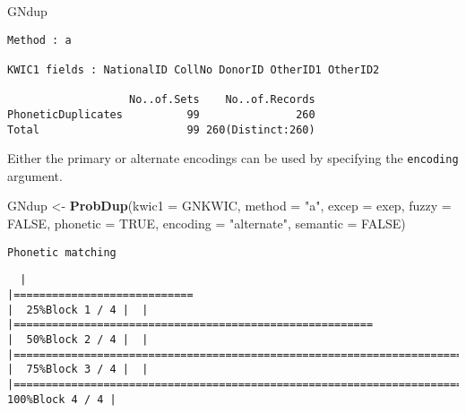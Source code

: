 \documentclass[
]{article}
\newenvironment{Shaded}{\begin{snugshade}}{\end{snugshade}}
\newcommand{\DataTypeTok}[1]{\textcolor[rgb]{0.13,0.29,0.53}{#1}}
\newcommand{\KeywordTok}[1]{\textcolor[rgb]{0.13,0.29,0.53}{\textbf{#1}}}
\newcommand{\NormalTok}[1]{#1}
\newcommand{\OtherTok}[1]{\textcolor[rgb]{0.56,0.35,0.01}{#1}}
\newcommand{\StringTok}[1]{\textcolor[rgb]{0.31,0.60,0.02}{#1}}
\begin{document}
\begin{Shaded}
\begin{Highlighting}[]
\NormalTok{GNdup}
\end{Highlighting}
\end{Shaded}

\begin{verbatim}
Method : a

KWIC1 fields : NationalID CollNo DonorID OtherID1 OtherID2
 
                   No..of.Sets    No..of.Records
PhoneticDuplicates          99               260
Total                       99 260(Distinct:260)
\end{verbatim}

Either the primary or alternate encodings can be used by specifying the
\texttt{encoding} argument.

\begin{Shaded}
\begin{Highlighting}[]
\NormalTok{GNdup <-}\StringTok{ }\KeywordTok{ProbDup}\NormalTok{(}\DataTypeTok{kwic1 =}\NormalTok{ GNKWIC, }\DataTypeTok{method =} \StringTok{"a"}\NormalTok{, }\DataTypeTok{excep =}\NormalTok{ exep, }
                 \DataTypeTok{fuzzy =} \OtherTok{FALSE}\NormalTok{,}
                 \DataTypeTok{phonetic =} \OtherTok{TRUE}\NormalTok{, }\DataTypeTok{encoding =} \StringTok{"alternate"}\NormalTok{,}
                 \DataTypeTok{semantic =} \OtherTok{FALSE}\NormalTok{)}
\end{Highlighting}
\end{Shaded}

\begin{verbatim}
Phonetic matching
\end{verbatim}

\begin{verbatim}
  |                                                                                                                       |============================                                                                                   |  25%Block 1 / 4 |  |                                                                                                                       |========================================================                                                       |  50%Block 2 / 4 |  |                                                                                                                       |===================================================================================                            |  75%Block 3 / 4 |  |                                                                                                                       |===============================================================================================================| 100%Block 4 / 4 |
\end{verbatim}
\end{document}
